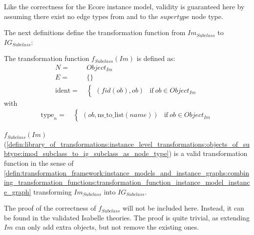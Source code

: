 Like the correctness for the Ecore instance model, validity is guaranteed here by assuming there exist no edge types from and to the $supertype$ node type.

The next definitions define the transformation function from $Im_{Subclass}$ to $IG_{Subclass}$:

\begin{defin}
\label{defin:library_of_transformations:instance_level_transformations:objects_of_subtype:imod_subclass_to_ig_subclass_as_node_type}
The transformation function $f_{Subclass}(Im)$ is defined as:
\begin{align*}
N =\ & Object_{Im} \\
E =\ & \{\} \\
\mathrm{ident} =\ & \begin{cases}
    (fid(ob), ob) & \mathrm{if }\ ob \in Object_{Im}
\end{cases}
\end{align*}
with
\begin{align*}
\mathrm{type}_n =\ & \begin{cases}
    (ob, \mathrm{ns\_\!to\_\!list}(name)) & \mathrm{if }\ ob \in Object_{Im}
\end{cases}
\end{align*}
\end{defin}

\begin{thm}
\label{defin:library_of_transformations:instance_level_transformations:objects_of_subtype:imod_subclass_to_ig_subclass_as_node_type_func}
$f_{Subclass}(Im)$ (\cref{defin:library_of_transformations:instance_level_transformations:objects_of_subtype:imod_subclass_to_ig_subclass_as_node_type}) is a valid transformation function in the sense of \cref{defin:transformation_framework:instance_models_and_instance_graphs:combining_transformation_functions:transformation_function_instance_model_instance_graph} transforming $Im_{Subclass}$ into $IG_{Subclass}$.
\end{thm}

The proof of the correctness of $f_{Subclass}$ will not be included here. Instead, it can be found in the validated Isabelle theories. The proof is quite trivial, as extending $Im$ can only add extra objects, but not remove the existing ones.

